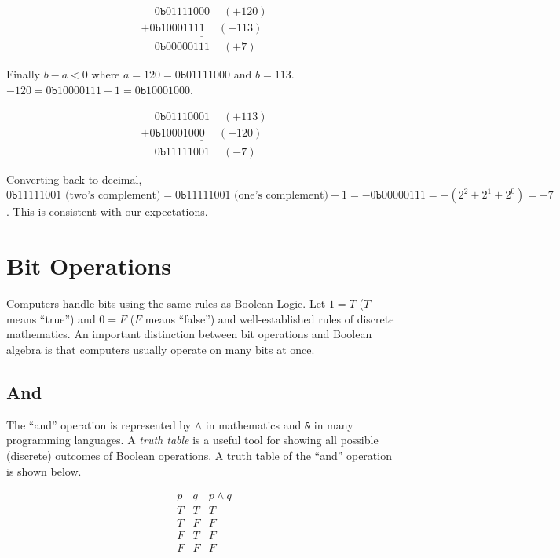 \documentclass{book}
\begin{document}
\begin{equation*}
\begin{array}{c}
\phantom{+}0\texttt{b}01111000 \phantom{+}(+120) \\
\underline{+0\texttt{b}10001111 \phantom{+}(-113)} \\
\phantom{+}0\texttt{b}00000111 \phantom{+}(+7)\phantom{9}\phantom{9}
\end{array}
\end{equation*}

Finally $b - a < 0$ where $a = 120 = 0\texttt{b}01111000$ and $b = 113$. $-120 = 0\texttt{b}10000111 + 1 = 0\texttt{b}10001000$.

\begin{equation*}
\begin{array}{c}
\phantom{+}0\texttt{b}01110001 \phantom{+}(+113) \\
\underline{+0\texttt{b}10001000 \phantom{+}(-120)} \\
\phantom{+}0\texttt{b}11111001 \phantom{+}(-7)\phantom{9}\phantom{9}
\end{array}
\end{equation*}

Converting back to decimal, $0\texttt{b}11111001 \textrm{ (two's complement)} = 0\texttt{b}11111001 \textrm{ (one's complement)} - 1 = -0\texttt{b}00000111 = -(2^2 + 2^1 + 2^0) = -7$. This is consistent with our expectations.

\section{Bit Operations}

Computers handle bits using the same rules as Boolean Logic. Let $1=T$ ($T$ means ``true'') and $0=F$ ($F$ means ``false'') and well-established rules of discrete mathematics. An important distinction between bit operations and Boolean algebra is that computers usually operate on many bits at once.

\subsection{And}

The ``and'' operation is represented by $\wedge$ in mathematics and \texttt{\&} in many programming languages. A \textit{truth table} is a useful tool for showing all possible (discrete) outcomes of Boolean operations. A truth table of the ``and'' operation is shown below.

\begin{equation*}
\begin{array}{c|c|c}
p & q & p \wedge q \\
\hline
T & T & T \\
T & F & F \\
F & T & F \\
F & F & F
\end{array}
\end{equation*}
\end{document}

